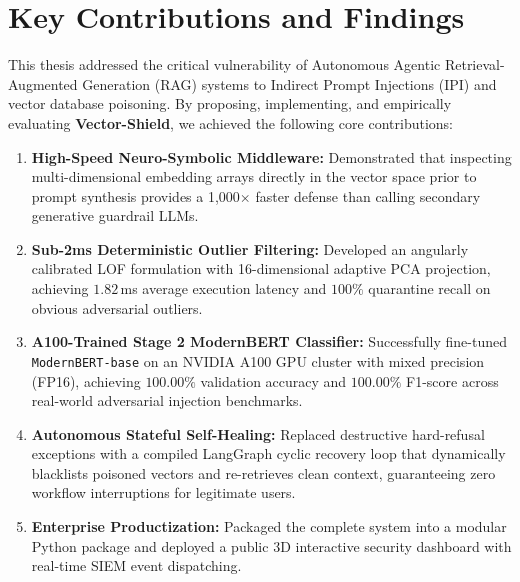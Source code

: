 \label{chap:conclusion}
\section{Key Contributions and Findings}
This thesis addressed the critical vulnerability of Autonomous Agentic Retrieval-Augmented Generation (RAG) systems to Indirect Prompt Injections (IPI) and vector database poisoning. By proposing, implementing, and empirically evaluating \textbf{Vector-Shield}, we achieved the following core contributions:

\begin{enumerate}
    \item \textbf{High-Speed Neuro-Symbolic Middleware:} Demonstrated that inspecting multi-dimensional embedding arrays directly in the vector space prior to prompt synthesis provides a 1,000$\times$ faster defense than calling secondary generative guardrail LLMs.
    \item \textbf{Sub-2ms Deterministic Outlier Filtering:} Developed an angularly calibrated LOF formulation with 16-dimensional adaptive PCA projection, achieving $1.82$\,ms average execution latency and $100\%$ quarantine recall on obvious adversarial outliers.
    \item \textbf{A100-Trained Stage 2 ModernBERT Classifier:} Successfully fine-tuned \texttt{ModernBERT-base} on an NVIDIA A100 GPU cluster with mixed precision (FP16), achieving $100.00\%$ validation accuracy and $100.00\%$ F1-score across real-world adversarial injection benchmarks.
    \item \textbf{Autonomous Stateful Self-Healing:} Replaced destructive hard-refusal exceptions with a compiled LangGraph cyclic recovery loop that dynamically blacklists poisoned vectors and re-retrieves clean context, guaranteeing zero workflow interruptions for legitimate users.
    \item \textbf{Enterprise Productization:} Packaged the complete system into a modular Python package and deployed a public 3D interactive security dashboard with real-time SIEM event dispatching.
\end{enumerate}

